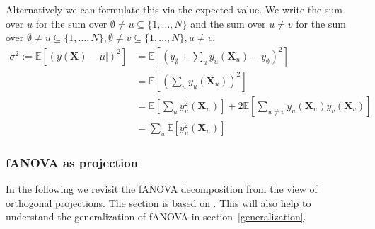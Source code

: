 Alternatively we can formulate this via the expected value. We write the sum over $u$ for the sum over $\emptyset \neq u \subseteq \{1, \dots, N\}$ and the sum over $u \neq v$ for the sum over $\emptyset \neq u \subseteq \{1, \dots, N\}, \emptyset \neq v \subseteq \{1, \dots, N\}, u \neq v$.
\begin{align*}
    \sigma^2 := \mathbb{E}[(y(\boldsymbol{X}) - \mu])^2]
    &= \mathbb{E}[(y_{\emptyset} + \sum_{u} y_u({\boldsymbol{X}_u}) - y_{\emptyset})^2] \\
    &= \mathbb{E}[(\sum_{u} y_u({\boldsymbol{X}_u}))^2] \\
    &= \mathbb{E}[\sum_{u} y_u^2({\boldsymbol{X}_u})] + 2 \mathbb{E}[\sum_{u \neq v} y_u({\boldsymbol{X}_u})  y_v({\boldsymbol{X}_v})] \\
    & = \sum_{u} \mathbb{E}[y_u^2({\boldsymbol{X}_u})]
\end{align*}




\subsubsection*{fANOVA as projection}
In the following we revisit the fANOVA decomposition from the view of orthogonal projections. The section is based on \cite{Vaart_1998}.
This will also help to understand the generalization of fANOVA in section~\ref{generalization}.\par

